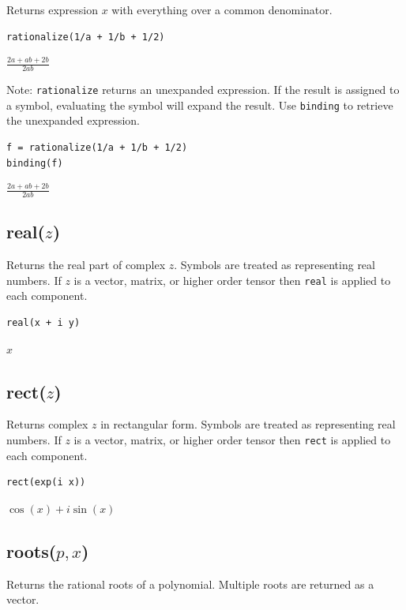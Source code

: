 Returns expression $x$ with everything over a common denominator.

{\color{blue}
\begin{verbatim}
rationalize(1/a + 1/b + 1/2)
\end{verbatim}
}

$\displaystyle \frac{2a+ab+2b}{2ab}$

\bigskip
Note:
\verb$rationalize$
returns an unexpanded expression.
If the result is assigned to a symbol, evaluating the symbol will expand the result.
Use
\verb$binding$
to retrieve the unexpanded expression.

{\color{blue}
\begin{verbatim}
f = rationalize(1/a + 1/b + 1/2)
binding(f)
\end{verbatim}
}

$\displaystyle \frac{2a+ab+2b}{2ab}$

\subsection*{real($z$)}

Returns the real part of complex $z$.
Symbols are treated as representing real numbers.
If $z$ is a vector, matrix, or higher order tensor then
\verb$real$ is applied to each component.

{\color{blue}
\begin{verbatim}
real(x + i y)
\end{verbatim}
}

$x$

\subsection*{rect($z$)}

Returns complex $z$ in rectangular form.
Symbols are treated as representing real numbers.
If $z$ is a vector, matrix, or higher order tensor then
\verb$rect$ is applied to each component.

{\color{blue}
\begin{verbatim}
rect(exp(i x))
\end{verbatim}
}

$\cos(x)+i\sin(x)$

\subsection*{roots($p,x$)}

Returns the rational roots of a polynomial.
Multiple roots are returned as a vector.

